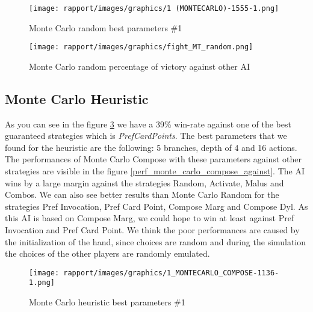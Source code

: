         \begin{figure}[H]
            \centering
            \texttt{[image: rapport/images/graphics/1 (MONTECARLO)-1555-1.png]}

            \caption{Monte Carlo random best parameters \#1}
            \label{perf_random}

        \end{figure}
        
        \begin{figure}[H]
            \centering
            \texttt{[image: rapport/images/graphics/fight\_MT\_random.png]}
            \caption{Monte Carlo random percentage of victory against other AI}
            \label{perf_monte_carlo_random_against}

        \end{figure}
        
        \subsection{Monte Carlo Heuristic}
        
        As you can see in the figure \ref{perf_monte_carlo_compose} we have a 39\% win-rate against one of the best guaranteed strategies which is \textit{PrefCardPoints}. The best parameters that we found for the heuristic are the following: 5 branches, depth of 4 and 16 actions.\\
        
        The performances of Monte Carlo Compose with these parameters against other strategies are visible in the figure \ref{perf_monte_carlo_compose_against}. The AI wins by a large margin against the strategies Random, Activate, Malus and Combos. We can also see better results than Monte Carlo Random for the strategies Pref Invocation, Pref Card Point, Compose Marg and Compose Dyl. As this AI is based on Compose Marg, we could hope to win at least against Pref Invocation and Pref Card Point. We think the poor performances are caused by the initialization of the hand, since choices are random and during the simulation the choices of the other players are randomly emulated.
        
        
        
        \begin{figure}[H]
            \centering
            \texttt{[image: rapport/images/graphics/1\_MONTECARLO\_COMPOSE-1136-1.png]}
            \caption{Monte Carlo heuristic best parameters \#1}
            \label{perf_monte_carlo_compose}

        \end{figure}
        
